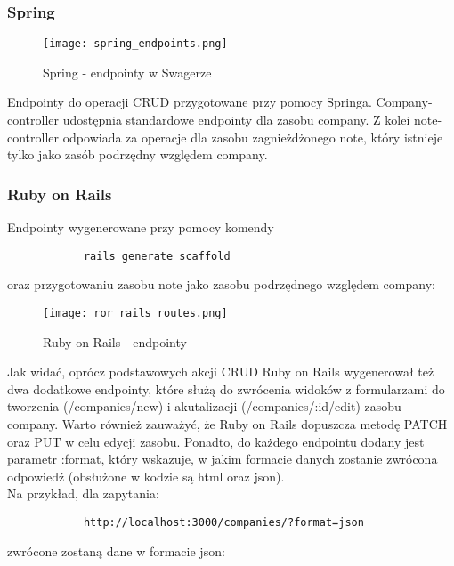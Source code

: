 		\subsubsection{Spring}
		\begin{figure}[H]
			\begin{center}
				\texttt{[image: spring\_endpoints.png]}
				\caption{\label{fig:spring-swagger-endpoints} Spring - endpointy w Swagerze}
			\end{center}
		\end{figure}
		Endpointy do operacji CRUD przygotowane przy pomocy Springa. Company-controller udostępnia standardowe endpointy dla zasobu company. Z kolei note-controller odpowiada za operacje dla zasobu zagnieżdżonego note, który istnieje tylko jako zasób podrzędny względem company.
		
		
		
		\subsubsection{Ruby on Rails}
		Endpointy wygenerowane przy pomocy komendy \cite{RoRDocs}
		\begin{verbatim}
			rails generate scaffold 
		\end{verbatim}
		oraz przygotowaniu zasobu note jako zasobu podrzędnego względem company:
		
		\begin{figure}[H]
			\begin{center}
				\texttt{[image: ror\_rails\_routes.png]}
				\caption{\label{fig:ror-endpoints} Ruby on Rails - endpointy}
			\end{center}
		\end{figure}
	
		Jak widać, oprócz podstawowych akcji CRUD Ruby on Rails wygenerował też dwa dodatkowe endpointy, które służą do zwrócenia widoków z formularzami do tworzenia (/companies/new) i akutalizacji (/companies/:id/edit) zasobu company. Warto również zauważyć, że Ruby on Rails dopuszcza metodę PATCH oraz PUT w celu edycji zasobu. Ponadto, do każdego endpointu dodany jest parametr :format, który wskazuje, w jakim formacie danych zostanie zwrócona odpowiedź (obsłużone w kodzie są html oraz json). \\
		
		\noindent Na przykład, dla zapytania:
		\begin{verbatim}
			http://localhost:3000/companies/?format=json
		\end{verbatim}
		zwrócone zostaną dane w formacie json:
		
